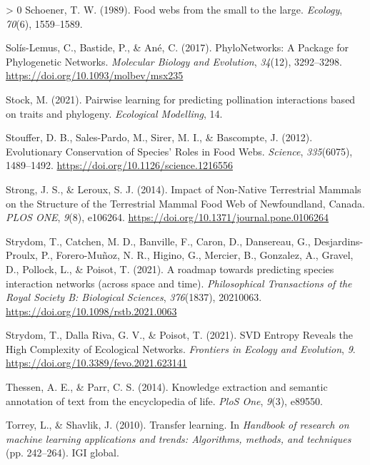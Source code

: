 \documentclass[10pt,oneside]{article}
\newlength{\cslhangindent}
\newenvironment{CSLReferences}[3] %
 {%
  \setlength{\parindent}{0pt}
  \ifodd #1 \everypar{\setlength{\hangindent}{\cslhangindent}}\ignorespaces\fi
  \ifnum #2 > 0
  \setlength{\parskip}{#2\baselineskip}
  \fi
 }%
 {}
\begin{document}
\begin{CSLReferences}{1}{0}
\leavevmode\hypertarget{ref-Schoener1989FooWeb}{}%
Schoener, T. W. (1989). Food webs from the small to the large.
\emph{Ecology}, \emph{70}(6), 1559--1589.

\leavevmode\hypertarget{ref-Solis-Lemus2017PhyPac}{}%
Solís-Lemus, C., Bastide, P., \& Ané, C. (2017). PhyloNetworks: A
Package for Phylogenetic Networks. \emph{Molecular Biology and
Evolution}, \emph{34}(12), 3292--3298.
\url{https://doi.org/10.1093/molbev/msx235}

\leavevmode\hypertarget{ref-Stock2021PaiLea}{}%
Stock, M. (2021). Pairwise learning for predicting pollination
interactions based on traits and phylogeny. \emph{Ecological Modelling},
14.

\leavevmode\hypertarget{ref-Stouffer2012EvoCon}{}%
Stouffer, D. B., Sales-Pardo, M., Sirer, M. I., \& Bascompte, J. (2012).
Evolutionary Conservation of Species' Roles in Food Webs.
\emph{Science}, \emph{335}(6075), 1489--1492.
\url{https://doi.org/10.1126/science.1216556}

\leavevmode\hypertarget{ref-Strong2014ImpNon}{}%
Strong, J. S., \& Leroux, S. J. (2014). Impact of Non-Native Terrestrial
Mammals on the Structure of the Terrestrial Mammal Food Web of
Newfoundland, Canada. \emph{PLOS ONE}, \emph{9}(8), e106264.
\url{https://doi.org/10.1371/journal.pone.0106264}

\leavevmode\hypertarget{ref-Strydom2021RoaPre}{}%
Strydom, T., Catchen, M. D., Banville, F., Caron, D., Dansereau, G.,
Desjardins-Proulx, P., Forero-Muñoz, N. R., Higino, G., Mercier, B.,
Gonzalez, A., Gravel, D., Pollock, L., \& Poisot, T. (2021). A roadmap
towards predicting species interaction networks (across space and time).
\emph{Philosophical Transactions of the Royal Society B: Biological
Sciences}, \emph{376}(1837), 20210063.
\url{https://doi.org/10.1098/rstb.2021.0063}

\leavevmode\hypertarget{ref-Strydom2021SvdEnt}{}%
Strydom, T., Dalla Riva, G. V., \& Poisot, T. (2021). SVD Entropy
Reveals the High Complexity of Ecological Networks. \emph{Frontiers in
Ecology and Evolution}, \emph{9}.
\url{https://doi.org/10.3389/fevo.2021.623141}

\leavevmode\hypertarget{ref-Thessen2014KnoExt}{}%
Thessen, A. E., \& Parr, C. S. (2014). Knowledge extraction and semantic
annotation of text from the encyclopedia of life. \emph{PloS One},
\emph{9}(3), e89550.

\leavevmode\hypertarget{ref-Torrey2010TraLea}{}%
Torrey, L., \& Shavlik, J. (2010). Transfer learning. In \emph{Handbook
of research on machine learning applications and trends: Algorithms,
methods, and techniques} (pp. 242--264). IGI global.


\end{CSLReferences}
\end{document}
